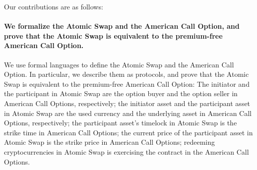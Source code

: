 
Our contributions are as follows:

\paragraph{We formalize the Atomic Swap and the American Call Option, and prove that the Atomic Swap is equivalent to the premium-free American Call Option.}
We use formal languages to define the Atomic Swap and the American Call Option.
In particular, we describe them as protocols, and prove that the Atomic Swap is equivalent to the premium-free American Call Option:
The initiator and the participant in Atomic Swap are the option buyer and the option seller in American Call Options, respectively;
the initiator asset and the participant asset in Atomic Swap are the used currency and the underlying asset in American Call Options, respectively;
the participant asset's timelock in Atomic Swap is the strike time in American Call Options;
the current price of the participant asset in Atomic Swap is the strike price in American Call Options;
redeeming cryptocurrencies in Atomic Swap is exercising the contract in the American Call Options.

